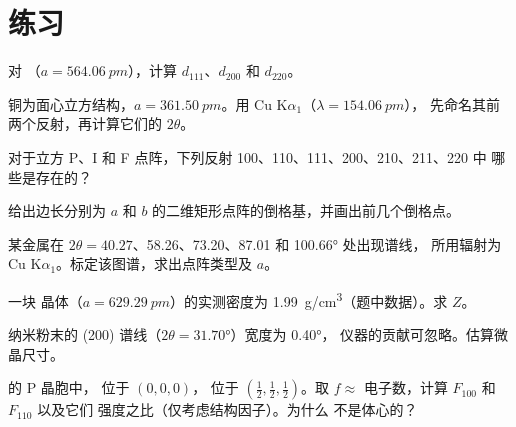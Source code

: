 \section{练习}

\begin{exercise}[$\star$]\label{exo:b3:x-ray-diffraction:1}
对 （$a = \qty{564.06}{pm}$），计算 $d_{111}$、$d_{200}$ 和 $d_{220}$。
\end{exercise}

\begin{exercise}[$\star$]\label{exo:b3:x-ray-diffraction:2}
铜为面心立方结构，$a = \qty{361.50}{pm}$。用 Cu K$\alpha_1$（$\lambda = \qty{154.06}{pm}$），
先命名其前两个反射，再计算它们的 $2\theta$。
\end{exercise}

\begin{exercise}[$\star$]\label{exo:b3:x-ray-diffraction:3}
对于立方 P、I 和 F 点阵，下列反射 100、110、111、200、210、211、220 中
哪些是存在的？
\end{exercise}

\begin{exercise}[$\star$]\label{exo:b3:x-ray-diffraction:4}
给出边长分别为
$a$ 和 $b$ 的二维矩形点阵的倒格基，并画出前几个倒格点。
\end{exercise}

\begin{exercise}[$\star\star$]\label{exo:b3:x-ray-diffraction:5}
某金属在 $2\theta = 40.27$、58.26、73.20、87.01 和 \ang{100.66} 处出现谱线，
所用辐射为 Cu K$\alpha_1$。标定该图谱，求出点阵类型及 $a$。
\end{exercise}

\begin{exercise}[$\star\star$]\label{exo:b3:x-ray-diffraction:6}
一块  晶体（$a = \qty{629.29}{pm}$）的实测密度为
\qty{1.99}{g/cm^3}（题中数据）。求 $Z$。
\end{exercise}

\begin{exercise}[$\star\star$]\label{exo:b3:x-ray-diffraction:7}
 纳米粉末的 (200) 谱线（$2\theta = \ang{31.70}$）宽度为 \ang{0.40}，
仪器的贡献可忽略。估算微晶尺寸。
\end{exercise}

\begin{exercise}[$\star\star$]\label{exo:b3:x-ray-diffraction:8}
 的 P 晶胞中， 位于 $(0,0,0)$， 位于 $(\frac12,\frac12,\frac12)$。取 $f
\approx$ 电子数，计算 $F_{100}$ 和 $F_{110}$ 以及它们
强度之比（仅考虑结构因子）。为什么  不是体心的？
\end{exercise}

